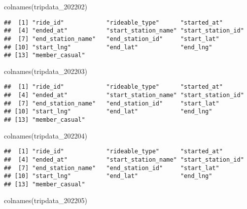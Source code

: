 \documentclass[
]{article}
\newenvironment{Shaded}{\begin{snugshade}}{\end{snugshade}}
\newcommand{\FunctionTok}[1]{\textcolor[rgb]{0.00,0.00,0.00}{#1}}
\newcommand{\NormalTok}[1]{#1}
\begin{document}
\begin{Shaded}
\begin{Highlighting}[]
\FunctionTok{colnames}\NormalTok{(tripdata\_202202)}
\end{Highlighting}
\end{Shaded}

\begin{verbatim}
##  [1] "ride_id"            "rideable_type"      "started_at"        
##  [4] "ended_at"           "start_station_name" "start_station_id"  
##  [7] "end_station_name"   "end_station_id"     "start_lat"         
## [10] "start_lng"          "end_lat"            "end_lng"           
## [13] "member_casual"
\end{verbatim}

\begin{Shaded}
\begin{Highlighting}[]
\FunctionTok{colnames}\NormalTok{(tripdata\_202203)}
\end{Highlighting}
\end{Shaded}

\begin{verbatim}
##  [1] "ride_id"            "rideable_type"      "started_at"        
##  [4] "ended_at"           "start_station_name" "start_station_id"  
##  [7] "end_station_name"   "end_station_id"     "start_lat"         
## [10] "start_lng"          "end_lat"            "end_lng"           
## [13] "member_casual"
\end{verbatim}

\begin{Shaded}
\begin{Highlighting}[]
\FunctionTok{colnames}\NormalTok{(tripdata\_202204)}
\end{Highlighting}
\end{Shaded}

\begin{verbatim}
##  [1] "ride_id"            "rideable_type"      "started_at"        
##  [4] "ended_at"           "start_station_name" "start_station_id"  
##  [7] "end_station_name"   "end_station_id"     "start_lat"         
## [10] "start_lng"          "end_lat"            "end_lng"           
## [13] "member_casual"
\end{verbatim}

\begin{Shaded}
\begin{Highlighting}[]
\FunctionTok{colnames}\NormalTok{(tripdata\_202205)}
\end{Highlighting}
\end{Shaded}
\end{document}
